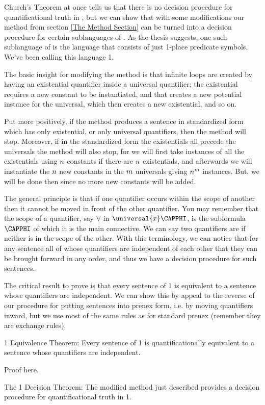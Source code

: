 Church's Theorem at once tells us that there is no decision procedure for quantificational truth in \GQL{}, but we can show that with some modifications our method from section \ref{The Method Section} can be turned into a decision procedure for certain sublanguages of \GQL{}. 
As the thesis suggests, one such sublanguage  of \GQL{} is the language that consists of just 1-place predicate symbols. 
We've been calling this language \GQL{}1.

The basic insight for modifying the method is that infinite loops are created by having an existential quantifier inside a universal quantifier; 
the existential requires a new constant to be instantiated, and that creates a new potential instance for the universal, which then creates a new existential, and so on. 

Put more positively, if the method produces a sentence in standardized form which has only existential, or only universal quantifiers, then the method will stop. 
Moreover, if in the standardized form the existentials all precede the universals the method will also stop, for we will first take instances of all the existentials using $n$ constants if there are $n$ existentials, and afterwards we will instantiate the $n$ new constants in the $m$ universals giving $n^m$ instances.
But, we will be done then since no more new constants will be added. 

The general principle is that if one quantifier occurs within the scope of another then it cannot be moved in front of the other quantifier. 
You may remember that the scope of a quantifier, say $\forall$ in $\universal{\variable{x}}\CAPPHI$, is the subformula $\CAPPHI$ of which it is the main connective. 
We can say two quantifiers are  if neither is in the scope of the other.
With this terminology, we can notice that for any sentence all of whose quantifiers are independent of each other that they can be brought forward in any order, and thus we have a decision procedure for such sentences. 

The critical result to prove is that every sentence of \GQL{}1 is equivalent to a sentence whose quantifiers are independent. 
We can show this by appeal to the reverse of our procedure for putting sentences into prenex form, i.e. by moving quantifiers inward, but we use most of the same rules as for standard prenex (remember they are exchange rules).
\begin{THEOREM}{  \GQL{}1 Equivalence Theorem:}
Every sentence of \GQL{}1 is quantificationally equivalent to a sentence whose quantifiers are independent.
\end{THEOREM}
\begin{PROOF}
Proof here.
\end{PROOF}
\begin{THEOREM}{ The \GQL{}1 Decision Theorem:}
The modified method just described provides a decision procedure for quantificational truth in \GQL{}1.
\end{THEOREM}

